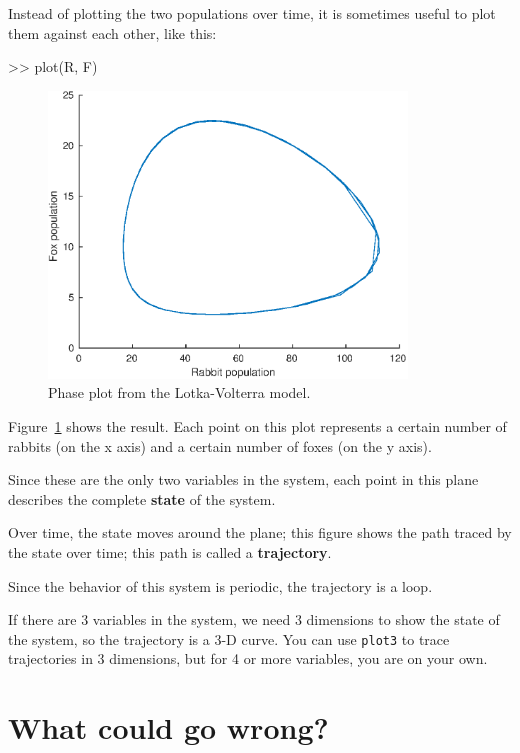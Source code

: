Instead of plotting the two populations over time, it is sometimes useful to plot them against each other, like this:

\begin{code}
>> plot(R, F)
\end{code}

\begin{figure}
\centerline{\includegraphics[height=3in]{book/figs/phase.eps}}
\caption{Phase plot from the Lotka-Volterra model.}
\label{fig:phase}
\end{figure}

Figure~\ref{fig:phase} shows the result.  Each point on this plot represents a certain number of rabbits (on the
x axis) and a certain number of foxes (on the y axis).

Since these are the only two variables in the system, each point in
this plane describes the complete {\bf state} of the system.


Over time, the state moves around the plane; this figure shows
the path traced by the state over time; this path
is called a {\bf trajectory}.

Since the behavior of this system is periodic, the trajectory is a loop.

If there are 3 variables in the system, we need 3 dimensions to show
the state of the system, so the trajectory is a 3-D curve.
You can use {\tt plot3} to trace trajectories in 3 dimensions,
but for 4 or more variables, you are on your own.



\section{What could go wrong?}

